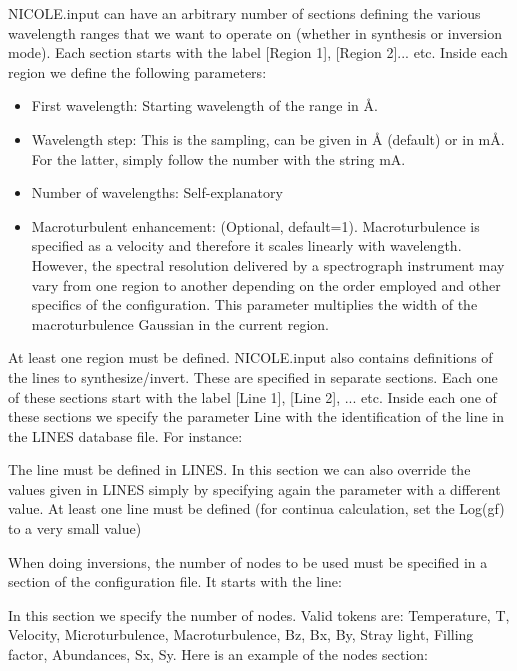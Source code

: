 NICOLE.input can have an arbitrary number of sections defining the
various wavelength ranges that we want to operate on (whether in
synthesis or inversion mode). Each section starts with the label
[Region 1], [Region 2]... etc. Inside each region we define the
following parameters:
\begin{itemize}
\item First wavelength: Starting wavelength of the range in \AA .
\item Wavelength step: This is the sampling, can be given in \AA
  (default) or in m\AA . For the latter, simply follow the number with
  the string mA. 
\item Number of wavelengths: Self-explanatory
\item Macroturbulent enhancement: (Optional,
  default=1). Macroturbulence is specified as a velocity and therefore
  it scales linearly with wavelength. However, the spectral resolution
  delivered by a spectrograph instrument may vary from one region to
  another depending on the order employed and other specifics of the
  configuration. This parameter multiplies the width of the
  macroturbulence Gaussian in the current region.
\end{itemize}

At least one region must be defined. NICOLE.input also contains
definitions of the lines to synthesize/invert. These are specified in
separate sections. Each one of these sections start with the label
[Line 1], [Line 2], ... etc. Inside each one of these sections we
specify the parameter Line with the identification of the line in the
LINES database file. For instance:

\vskip12pt
\vskip12pt

The line must be defined in LINES. In this section we can also
override the values given in LINES simply by specifying again the
parameter with a different value. At least one line must be defined
(for continua calculation, set the Log(gf) to a very small value)

When doing inversions, the number of nodes to be used must be
specified in a section of the configuration file. It starts with the
line:

\vskip12pt
\leftline{
[Nodes]}
\vskip12pt

In this section we specify the number of nodes. Valid tokens are:
Temperature, T, Velocity, Microturbulence,
Macroturbulence, Bz, Bx, By,
Stray light, Filling factor, Abundances, Sx, Sy.
Here is an example of the nodes section:

